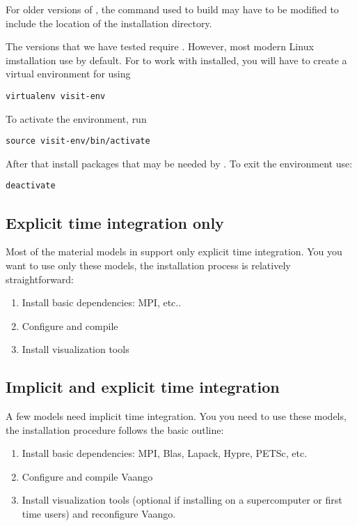 \documentclass[11pt,fleqn]{book} %
\begin{document}
For older versions of \Visit, the  command used to
build \Vaango may have to be modified to include the location of 
the \Visit installation directory.  

\begin{WarningBox}
The \Visit versions that we have tested require .  However, most
modern Linux imstallation use  by default.  For \Visit to work with
 installed, you will have to create a virtual environment for 
 using
\begin{lstlisting}[backgroundcolor=\color{background}]
virtualenv visit-env
\end{lstlisting}
To activate the environment, run
\begin{lstlisting}[backgroundcolor=\color{background}]
source visit-env/bin/activate
\end{lstlisting}
After that install packages that may be needed by \Visit.  To exit the environment use:
\begin{lstlisting}[backgroundcolor=\color{background}]
deactivate
\end{lstlisting}
\end{WarningBox}

\subsection{Explicit time integration only}
Most of the material models in \Vaango support only explicit time
integration.  You you want to use only these models, the installation 
process is relatively straightforward:
\begin{enumerate}
\item Install basic dependencies: MPI, etc..
\item Configure and compile \Vaango
\item Install visualization tools 
\end{enumerate}

\subsection{Implicit and explicit time integration}
A few \Vaango models need implicit time integration.  You you need to use these
models, the installation procedure follows the basic outline:
\begin{enumerate}
\item Install basic dependencies: MPI, Blas, Lapack, Hypre, PETSc, etc.
\item Configure and compile Vaango
\item Install visualization tools (optional if installing on a
  supercomputer or first time users) and reconfigure Vaango.
\end{enumerate}
\end{document}
